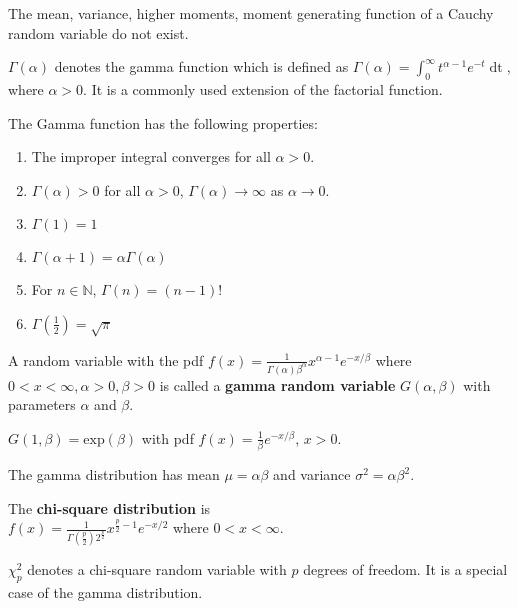 The mean, variance, higher moments, moment generating function of a Cauchy random variable do not exist.

\begin{defn}
    $\Gamma(\alpha)$ denotes the gamma function which is defined as $\Gamma(\alpha) = \displaystyle\int_0^\infty t ^{\alpha - 1} e ^{-t} \mathop{\mathrm{d} t}$, where $\alpha > 0$. It is a commonly used extension of the factorial function.
\end{defn}

\begin{thm}
    The Gamma function has the following properties:
    \begin{enumerate}
        \item The improper integral converges for all $\alpha > 0$.
        \item $\Gamma(\alpha) > 0$  for all $\alpha > 0$, $\Gamma(\alpha) \to \infty$ as $\alpha \to 0$.
        \item $\Gamma(1) = 1$
        \item $\Gamma(\alpha + 1) = \alpha \Gamma(\alpha)$
        \item For $n \in \mathbb{N}$, $\Gamma(n) = (n-1)!$
        \item $\Gamma(\frac{1}{2}) = \sqrt{\pi}$
    \end{enumerate}
\end{thm}

\begin{defn}
    A random variable with the pdf $f(x) = \displaystyle  \frac{1}{\Gamma(\alpha) \beta^\alpha} x^{\alpha - 1} e^{-x/\beta}$ where $0 < x < \infty, \alpha > 0, \beta > 0$ is called a \textbf{gamma random variable} $G(\alpha, \beta)$ with parameters $\alpha$ and $\beta$.
\end{defn}
$G(1, \beta) = \text{exp}(\beta)$ with pdf $f(x) = \frac{1}{\beta} e^{-x/\beta}$, $x > 0$.

The gamma distribution has mean $\mu = \alpha \beta$ and variance $\sigma^2 = \alpha \beta^2$.

\begin{defn}
    The \textbf{chi-square distribution} is \\
    $f(x) = \displaystyle \frac{1}{\Gamma(\frac{p}{2}) 2^{\frac{p}{2}}} x^{\frac{p}{2} - 1} e ^{-x/2}$ where $0 < x < \infty$.

    \vspace{0.5cm}
    $\chi_p^2$ denotes a chi-square random variable with $p$ degrees of freedom. It is a special case of the gamma distribution.
\end{defn}

